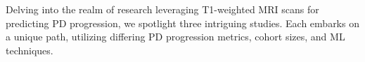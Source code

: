 


Delving into the realm of research leveraging T1-weighted MRI scans for predicting PD progression, we spotlight three intriguing studies. Each embarks on a unique path, utilizing differing 
PD progression metrics, cohort sizes, and ML techniques.








 

